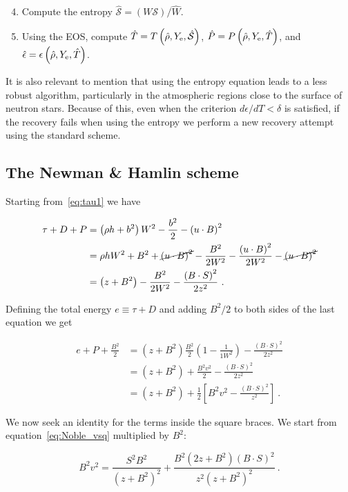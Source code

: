 \documentclass{article}
\newcommand{\ye}{Y_{\rm e}}
\newcommand{\BdotS}{B\cdot S}
\newcommand{\udotB}{u\cdot B}
\newcommand{\ent}{\mathcal{S}}
\newcommand{\eq}[1]{
\begin{equation}
    #1
\end{equation}
}
\newcommand{\spl}[1]{
\eq{
\begin{split}
    #1
\end{split}
}
}
\begin{document}
\begin{enumerate}
\setcounter{enumi}{3}
\item Compute the entropy $\hat{\ent} = \left(W\ent\right) / \hat{W}$.
\item Using the EOS, compute $\hat{T} = T\left(\hat{\rho},\ye,\hat{\ent}\right)$, $\hat{P}=P\left(\hat{\rho},\ye,\hat{T}\right)$, and $\hat{\epsilon}=\epsilon\left(\hat{\rho},\ye,\hat{T}\right)$.
\end{enumerate}

\noindent It is also relevant to mention that using the entropy equation leads to a less robust algorithm, particularly in the atmospheric regions close to the surface of neutron stars. Because of this, even when the criterion $d\epsilon/dT < \delta$ is satisfied, if the recovery fails when using the entropy we perform a new recovery attempt using the standard scheme.

\subsection{The Newman \& Hamlin scheme}

Starting from~\eqref{eq:tau1} we have

\spl{
  \tau + D + P &= \left(\rho h + b^{2}\right)W^{2} - \frac{b^{2}}{2} - \left(\udotB\right)^{2}\\
  &= \rho h W^{2} + B^{2} + \cancel{\left(\udotB\right)^{2}} - \frac{B^{2}}{2W^{2}} - \frac{\left(\udotB\right)^{2}}{2W^{2}} - \cancel{\left(\udotB\right)^{2}}\\
  &= \left(z + B^{2}\right) - \frac{B^{2}}{2W^{2}} - \frac{\left(\BdotS\right)^{2}}{2z^{2}}\ .
}

\noindent Defining the total energy $e \equiv \tau + D$ and adding $B^{2}/2$ to both sides of the last equation we get

\spl{
  e + P + \frac{B^{2}}{2} &= \left(z + B^{2}\right) \frac{B^{2}}{2}\left( 1 - \frac{1}{1W^{2}}\right) - \frac{\left(\BdotS\right)^{2}}{2z^{2}}\\
  &= \left(z + B^{2}\right) + \frac{B^{2}v^{2}}{2} - \frac{\left(\BdotS\right)^{2}}{2z^{2}}\\
  &= \left(z + B^{2}\right) + \frac{1}{2}\left[B^{2}v^{2} - \frac{\left(\BdotS\right)^{2}}{z^{2}}\right]\ .\label{eq:Newman1}
}

\noindent We now seek an identity for the terms inside the square braces. We start from equation~\eqref{eq:Noble_vsq} multiplied by $B^{2}$:

\eq{
  B^{2}v^{2} = \frac{S^{2}B^{2}}{\left(z+B^{2}\right)^{2}} + \frac{B^{2}\left(2z + B^{2}\right)\left(\BdotS\right)^{2}}{z^{2}\left(z+B^{2}\right)^{2}}\ .
}
\end{document}
